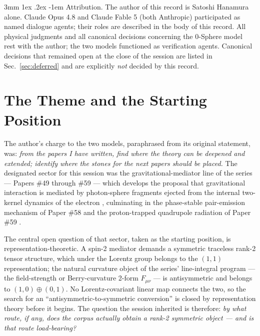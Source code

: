 \documentclass[%
 reprint, amsmath,amssymb, aps, prb, ]{revtex4-2}
\makeatletter
\numberwithin{equation}{section}
\renewcommand\paragraph{%
  \@startsection{paragraph}{4}{\z@}%
    {3mm \@plus 1ex \@minus .2ex}%
    {-1em}%
    {\normalfont\normalsize\itshape}}
\makeatother
\begin{document}
\paragraph{Attribution.} The author of this record is Satoshi Hanamura alone. Claude Opus 4.8 and Claude Fable 5 (both Anthropic) participated as named dialogue agents; their roles are described in the body of this record. All physical judgments and all canonical decisions concerning the 0-Sphere model rest with the author; the two models functioned as verification agents. Canonical decisions that remained open at the close of the session are listed in Sec.~\ref{sec:deferred} and are explicitly \emph{not} decided by this record.

\section{The Theme and the Starting Position}
\label{sec:theme}

The author's charge to the two models, paraphrased from its original statement, was: \emph{from the papers I have written, find where the theory can be deepened and extended; identify where the stones for the next papers should be placed.} The designated sector for this session was the gravitational-mediator line of the series --- Papers \#49 through \#59 --- which develops the proposal that gravitational interaction is mediated by photon-sphere fragments ejected from the internal two-kernel dynamics of the electron \cite{hanamura49}, culminating in the phase-stable pair-emission mechanism of Paper \#58 \cite{hanamura58} and the proton-trapped quadrupole radiation of Paper \#59 \cite{hanamura59}.

The central open question of that sector, taken as the starting position, is representation-theoretic. A spin-2 mediator demands a symmetric traceless rank-2 tensor structure, which under the Lorentz group belongs to the $(1,1)$ representation; the natural curvature object of the series' line-integral program --- the field-strength or Berry-curvature 2-form $F_{\mu\nu}$ --- is antisymmetric and belongs to $(1,0)\oplus(0,1)$. No Lorentz-covariant linear map connects the two, so the search for an ``antisymmetric-to-symmetric conversion'' is closed by representation theory before it begins. The question the session inherited is therefore: \emph{by what route, if any, does the corpus actually obtain a rank-2 symmetric object --- and is that route load-bearing?}
\end{document}
